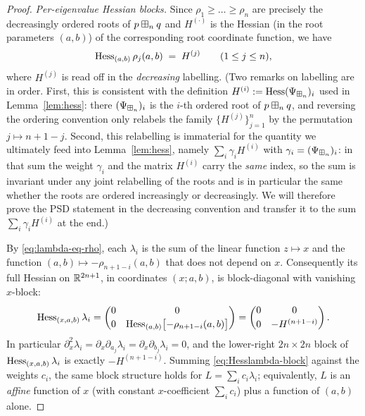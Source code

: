 \begin{proof}
\smallskip\noindent\emph{Per-eigenvalue Hessian blocks.}
Since $\rho_1\ge\dots\ge\rho_n$ are precisely the decreasingly ordered roots of
$p\boxplus_n q$ and $H^{(\cdot)}$ is the Hessian (in the root parameters $(a,b)$)
of the corresponding root coordinate function, we have
\[
\operatorname{Hess}_{(a,b)}\rho_j(a,b)\;=\;H^{(j)}\qquad(1\le j\le n),
\]
where $H^{(j)}$ is read off in the \emph{decreasing} labelling. (Two remarks on
labelling are in order. First, this is consistent with the definition
$H^{(i)}:=\operatorname{Hess}(\Psi_{\boxplus_n})_i$ used in Lemma~\ref{lem:hess}: there
$(\Psi_{\boxplus_n})_i$ is the $i$-th ordered root of $p\boxplus_n q$, and reversing
the ordering convention only relabels the family $\{H^{(j)}\}_{j=1}^n$ by the
permutation $j\mapsto n+1-j$. Second, this relabelling is immaterial for the
quantity we ultimately feed into Lemma~\ref{lem:hess}, namely
$\sum_i\gamma_i H^{(i)}$ with $\gamma_i=(\Psi_{\boxplus_n})_i$: in that sum the
weight $\gamma_i$ and the matrix $H^{(i)}$ carry the \emph{same} index, so the
sum is invariant under any joint relabelling of the roots and is in particular
the same whether the roots are ordered increasingly or decreasingly. We will
therefore prove the PSD statement in the decreasing convention and transfer it
to the sum $\sum_i\gamma_iH^{(i)}$ at the end.)

By \eqref{eq:lambda-eq-rho}, each $\lambda_i$ is the sum of the linear function
$z\mapsto x$ and the function $(a,b)\mapsto-\rho_{n+1-i}(a,b)$ that does not
depend on $x$. Consequently its full Hessian on $\mathbb{R}^{2n+1}$, in coordinates
$(x;a,b)$, is block-diagonal with vanishing $x$-block:
\begin{equation}\label{eq:Hesslambda-block}
\operatorname{Hess}_{(x,a,b)}\lambda_i
=\begin{pmatrix}0 & 0\\[2pt] 0 & \operatorname{Hess}_{(a,b)}\bigl[-\rho_{n+1-i}(a,b)\bigr]\end{pmatrix}
=\begin{pmatrix}0 & 0\\[2pt] 0 & -H^{(n+1-i)}\end{pmatrix}.
\end{equation}
In particular $\partial_x^2\lambda_i=\partial_x\partial_{a_j}\lambda_i
=\partial_x\partial_{b_j}\lambda_i=0$, and the lower-right $2n\times2n$ block of
$\operatorname{Hess}_{(x,a,b)}\lambda_i$ is exactly $-H^{(n+1-i)}$. Summing
\eqref{eq:Hesslambda-block} against the weights $c_i$, the same block structure
holds for $L=\sum_i c_i\lambda_i$; equivalently, $L$ is an \emph{affine} function
of $x$ (with constant $x$-coefficient $\sum_i c_i$) plus a function of $(a,b)$
alone.


\end{proof}
